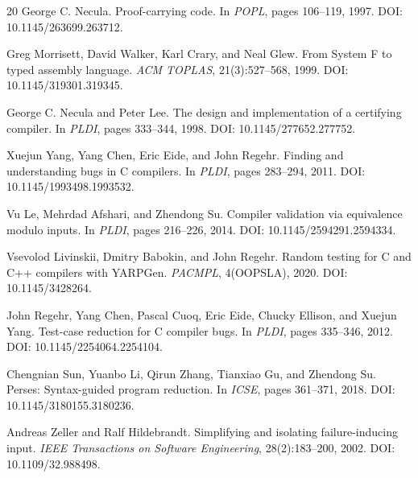 \begin{thebibliography}{20}
George C. Necula.
\newblock Proof-carrying code.
\newblock In \emph{POPL}, pages 106--119, 1997. DOI: 10.1145/263699.263712.

Greg Morrisett, David Walker, Karl Crary, and Neal Glew.
\newblock From System F to typed assembly language.
\newblock \emph{ACM TOPLAS}, 21(3):527--568, 1999. DOI: 10.1145/319301.319345.

George C. Necula and Peter Lee.
\newblock The design and implementation of a certifying compiler.
\newblock In \emph{PLDI}, pages 333--344, 1998. DOI: 10.1145/277652.277752.

Xuejun Yang, Yang Chen, Eric Eide, and John Regehr.
\newblock Finding and understanding bugs in C compilers.
\newblock In \emph{PLDI}, pages 283--294, 2011. DOI: 10.1145/1993498.1993532.

Vu Le, Mehrdad Afshari, and Zhendong Su.
\newblock Compiler validation via equivalence modulo inputs.
\newblock In \emph{PLDI}, pages 216--226, 2014. DOI: 10.1145/2594291.2594334.

Vsevolod Livinskii, Dmitry Babokin, and John Regehr.
\newblock Random testing for C and C++ compilers with YARPGen.
\newblock \emph{PACMPL}, 4(OOPSLA), 2020. DOI: 10.1145/3428264.

John Regehr, Yang Chen, Pascal Cuoq, Eric Eide, Chucky Ellison, and Xuejun Yang.
\newblock Test-case reduction for C compiler bugs.
\newblock In \emph{PLDI}, pages 335--346, 2012. DOI: 10.1145/2254064.2254104.

Chengnian Sun, Yuanbo Li, Qirun Zhang, Tianxiao Gu, and Zhendong Su.
\newblock Perses: Syntax-guided program reduction.
\newblock In \emph{ICSE}, pages 361--371, 2018. DOI: 10.1145/3180155.3180236.

Andreas Zeller and Ralf Hildebrandt.
\newblock Simplifying and isolating failure-inducing input.
\newblock \emph{IEEE Transactions on Software Engineering}, 28(2):183--200, 2002. DOI: 10.1109/32.988498.

\end{thebibliography}
